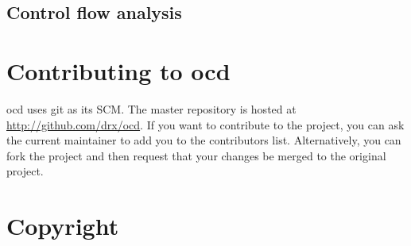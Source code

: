 \documentclass[leqno,11pt]{article}
\begin{document}
\subsection{Control flow analysis}

\section{Contributing to ocd}

ocd uses git as its SCM. The master repository is hosted at \url{http://github.com/drx/ocd}. If you want to contribute to the project, you can ask the current maintainer to add you to the contributors list. Alternatively, you can fork the project and then request that your changes be merged to the original project.

\section{Copyright}


\end{document}
